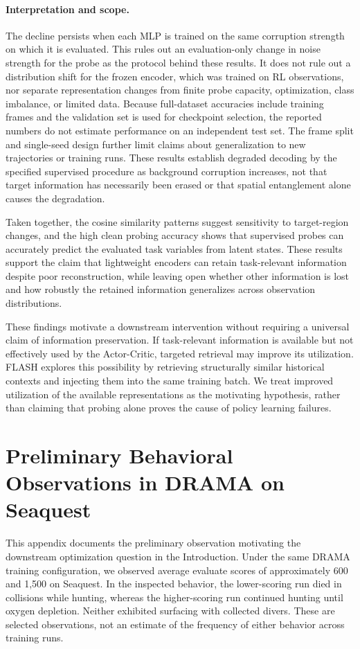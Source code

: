\documentclass{article} %
\begin{document}
\paragraph{Interpretation and scope.}
The decline persists when each MLP is trained on the same corruption strength on which it is evaluated. This rules out an evaluation-only change in noise strength for the probe as the protocol behind these results. It does not rule out a distribution shift for the frozen encoder, which was trained on RL observations, nor separate representation changes from finite probe capacity, optimization, class imbalance, or limited data. Because full-dataset accuracies include training frames and the validation set is used for checkpoint selection, the reported numbers do not estimate performance on an independent test set. The frame split and single-seed design further limit claims about generalization to new trajectories or training runs. These results establish degraded decoding by the specified supervised procedure as background corruption increases, not that target information has necessarily been erased or that spatial entanglement alone causes the degradation.

Taken together, the cosine similarity patterns suggest sensitivity to target-region changes, and the high clean probing accuracy shows that supervised probes can accurately predict the evaluated task variables from latent states. These results support the claim that lightweight encoders can retain task-relevant information despite poor reconstruction, while leaving open whether other information is lost and how robustly the retained information generalizes across observation distributions.

These findings motivate a downstream intervention without requiring a universal claim of information preservation. If task-relevant information is available but not effectively used by the Actor-Critic, targeted retrieval may improve its utilization. FLASH explores this possibility by retrieving structurally similar historical contexts and injecting them into the same training batch. We treat improved utilization of the available representations as the motivating hypothesis, rather than claiming that probing alone proves the cause of policy learning failures.

\section{Preliminary Behavioral Observations in DRAMA on Seaquest}
\label{sec:appendix_ac_bottleneck}
This appendix documents the preliminary observation motivating the downstream optimization question in the Introduction. Under the same DRAMA training configuration, we observed average evaluate scores of approximately 600 and 1,500 on Seaquest. In the inspected behavior, the lower-scoring run died in collisions while hunting, whereas the higher-scoring run continued hunting until oxygen depletion. Neither exhibited surfacing with collected divers. These are selected observations, not an estimate of the frequency of either behavior across training runs.
\end{document}

